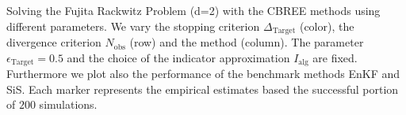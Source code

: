 Solving the Fujita Rackwitz Problem (d=2) with the CBREE methods using      different parameters.     We vary the stopping criterion $\Delta_{\text{Target}}$ (color),     the divergence criterion $N_\text{obs}$ (row) and     the method  (column).     The parameter $\epsilon_{\text{Target}} = 0.5$     and the choice of the indicator approximation $I_\text{alg}$     are fixed.     Furthermore we plot also the performance of the benchmark methods EnKF     and SiS.     Each marker represents the empirical estimates based the successful portion of $200$ simulations.